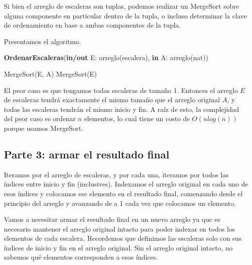 Si bien el arreglo de escaleras son tuplas, podemos realizar un MergeSort sobre alguna componente en particular dentro de la tupla, o incluso determinar la clave de ordenamiento en base a ambas componentes de la tupla.


Presentamos el algoritmo.

\begin{algorithm}[H]
\caption{
    \textbf{OrdenarEscaleras}(\textbf{in/out} E: arreglo(escalera), \textbf{in} A: arreglo(nat))
}
\begin{algorithmic}[1]
    \State MergeSort(E, A) 
    \State MergeSort(E) 
\end{algorithmic}
\end{algorithm}

El peor caso es que tengamos todas escaleras de tamaño 1. Entonces el arreglo $E$ de escaleras tendrá exactamente el mismo tamaño que el arreglo original $A$, y todas las escaleras tendrán el mismo inicio y fin. A raíz de esto, la complejidad del peor caso es ordenar $n$ elementos, lo cual tiene un costo de $O(n log(n))$ porque usamos MergeSort.

\subsection*{Parte 3: armar el resultado final}


Iteramos por el arreglo de escaleras, y por cada una, iteramos por todos las índices entre inicio y fin (inclusives). Indexamos el arreglo original en cada uno de esos índices y colocamos ese elemento en el resultado final, comenzando desde el principio del arreglo y avanzando de a 1 cada vez que colocamos un elemento.


Vamos a necesitar armar el resultado final en un nuevo arreglo ya que es necesario mantener el arreglo original intacto para poder indexar en todos los elementos de cada escalera. Recordemos que definimos las escaleras solo con sus índices de inicio y fin en el arreglo original. Sin el arreglo original intacto, no sabemos qué elementos corresponden a esos índices.

